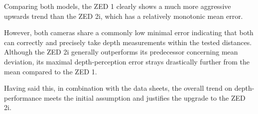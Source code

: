 Comparing both models, the ZED 1 clearly shows a much more aggressive upwards trend than the ZED 2i, which has a relatively monotonic mean error. 

However, both cameras share a commonly low minimal error indicating that both can correctly and precisely take depth measurements within the tested distances. 
Although the ZED 2i generally outperforms its predecessor concerning mean deviation, its maximal depth-perception error strays drastically further from the mean compared to the ZED 1. 



Having said this, in combination with the data sheets, the overall trend on depth-performance meets the initial assumption and justifies the upgrade to the ZED 2i.


\filbreak